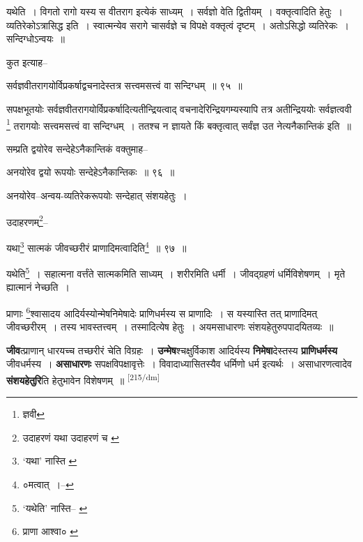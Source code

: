 \documentclass[article,12pt,a4paper]{memoir}
\begin{document}
	  \pstart यथेति । विगतो रागो यस्य स वीतराग इत्येकं साध्यम् । सर्वज्ञो वेति द्वितीयम् । वक्तृत्वादिति हेतुः । व्यतिरेकोऽत्रासिद्ध इति । स्वात्मन्येव सरागे चासर्वज्ञे च विपक्षे वक्तृत्वं दृष्टम् । अतोऽसिद्धो व्यतिरेकः । सन्दिग्धोऽन्वयः ॥
	\pend
       

	  \pstart कुत इत्याह--
	\pend
       

	  \pstart सर्वज्ञवीतरागयोर्विप्रकर्षाद्वचनादेस्तत्र सत्त्वमसत्त्वं वा सन्दिग्धम् ॥ ९५ ॥
	\pend
       

	  \pstart सपक्षभूतयोः सर्वज्ञवीतरागयोर्विप्रकर्षादित्यतीन्द्रियत्वाद् वचनादेरिन्द्रियगम्यस्यापि तत्र अतीन्द्रिययोः सर्वज्ञत्ववी \footnote{ज्ञवी} तरागयोः सत्त्वमसत्त्वं वा सन्दिग्धम् । ततश्च न ज्ञायते किं बक्तृत्वात् सर्वंज्ञ उत नेत्यनैकान्तिकं इति ॥
	\pend
       

	  \pstart सम्प्रति द्वयोरेव सन्देहेऽनैकान्तिकं वक्तुमाह--
	\pend
       

	  \pstart अनयोरेव द्वयो रूपयोः सन्देहेऽनैकान्तिकः ॥ ९६ ॥
	\pend
       

	  \pstart अनयोरेव--अन्वय-व्यतिरेकरूपयोः सन्देहात् संशयहेतुः ।
	\pend
       

	  \pstart उदाहरणम्\footnote{उदाहरणं यथा \cite{dp-msD} उदाहरणं च \cite{dp-msC}}--
	\pend
       

	  \pstart यथा\footnote{‘यथा’ नास्ति \cite{dp-msB} \cite{dp-msC} \cite{dp-msD} \cite{dp-edP} \cite{dp-edH}} सात्मकं जीवच्छरीरं प्राणादिमत्वादिति\footnote{०मत्वात् ।--\cite{dp-msC}} ॥ ९७ ॥
	\pend
       

	  \pstart यथेति\footnote{‘यथेति’ नास्ति--\cite{dp-msA} \cite{dp-msB} \cite{dp-msC} \cite{dp-msD} \cite{dp-edP} \cite{dp-edH} \cite{dp-edN}} । सहात्मना वर्त्तंते सात्मकमिति साध्यम् । शरीरमिति धर्मी । जीवद्ग्रहणं धर्मिविशेषणम् । मृते ह्यात्मानं नेच्छति ।
	\pend
       

	  \pstart प्राणाः \footnote{प्राणा आश्वा० \cite{dp-msA} \cite{dp-msB} \cite{dp-edP} \cite{dp-edH} \cite{dp-edE} \cite{dp-edN}}श्वासादय आदिर्यस्योन्मेषनिमेषादेः प्राणिधर्मस्य स प्राणादिः । स यस्यास्ति तत् प्राणादिमत् जीवच्छरीरम् । तस्य भावस्तत्त्वम् । तस्मादित्येष हेतुः । अयमसाधारणः संशयहेतुरुपपादयितव्यः ॥
	\pend
      

	  \pstart \textbf{जीव}त्प्राणान् धारयच्च तच्छरीरं चेति विग्रहः । \textbf{उन्मेष}श्चक्षुर्विकाश आदिर्यस्य \textbf{निमेषा}देस्तस्य \textbf{प्राणिधर्मस्य} जीवधर्मस्य । \textbf{असाधारणः} सपक्षविपक्षावृत्तेः । विवादाध्यासितस्यैव धर्मिणो धर्म इत्यर्थः । असाधारणत्वादेव \textbf{संशयहेतुरि}ति हेतुभावेन विशेषणम् ॥
	\pend
      \leavevmode\textsuperscript{\rmlatinfont\tiny [215/dm]}
\end{document}

